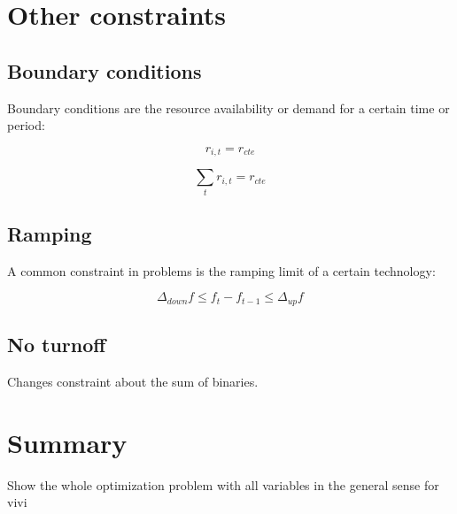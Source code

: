 \documentclass[10pt,twoside,a4paper]{report}
\begin{document}

\section{Other constraints}

\subsection{Boundary conditions}
Boundary conditions are the resource availability or demand for a certain time or period:

\begin{equation}
  r_{i,t} = r_{cte}
\end{equation}

\begin{equation}
  \sum_t r_{i,t} = r_{cte}
\end{equation}

\subsection{Ramping}
A common constraint in problems is the ramping limit of a certain
technology:

\begin{equation}
  \Delta_{down} f \leq f_t-f_{t-1} \leq \Delta_{up} f
\end{equation}



\subsection{No turnoff}
Changes constraint about the sum of binaries.

\section{Summary}

Show the whole optimization problem with all variables in the general sense for vivi



\end{document}
